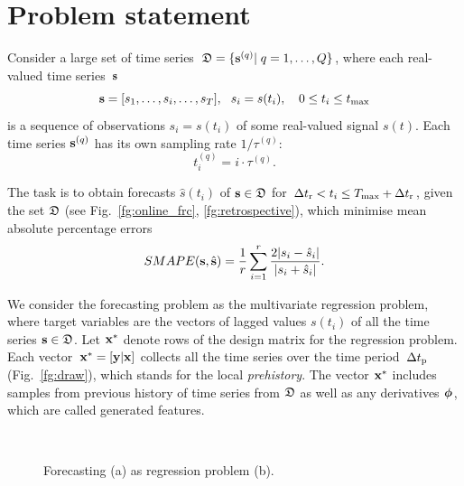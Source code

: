 \documentclass[conference]{IEEEtran}
\begin{document}
\section{Problem statement}
Consider a large set of time series~${\mathfrak{D}}=\{{\mathbf{s}}^{(q)}| \; q = 1,\dots, {Q}\}$, where each real-valued time series~${\mathbf{s}}$
\[ {\mathbf{s}} = [s_1, \dots, s_i, \dots, s_{T}], ~~ s_i = s(t_i),\quad 0 \leq t_i \leq t_{\max}\]
is a sequence of observations $s_i = s(t_i)$ of some real-valued signal $s(t)$.
Each time series ${\mathbf{s}}^{(q)}$ has its own sampling rate $1/\tau^{(q)}$:
\[t_i^{(q)} = {i}\cdot\tau^{(q)}.\]

 The task is to obtain forecasts $\hat{s}(t_i)$ of ${\mathbf{s}} \in {\mathfrak{D}}$ for  $\Delta t_\text{r} <  t_i \leq T_{\max} + \Delta t_\text{r}$, given the set  ${\mathfrak{D}}$ (see Fig.~\ref{fg:online_frc}, \ref{fg:retrospective}), which minimise mean absolute percentage errors
 \begin{equation}\label{eq:MAPE}
 SMAPE(\bs, \hat{\bs}) = \frac{1}{r}\sum_{i = 1}^{r} \frac{2|s_i - \hat{s}_i|}{|s_i + \hat{s}_i|}. \end{equation}


 We consider the forecasting problem as the multivariate regression problem, where target variables are the vectors of lagged values $s(t_i)$ of all the time series ${\mathbf{s}} \in {\mathfrak{D}}$. Let ${\mathbf{x}}^{*}$ denote rows of the design matrix for the regression problem. Each vector~${\mathbf{x}}^{*} = [{\mathbf{y}}| {\mathbf{x}}]$ collects all the time series over the time period~$\Delta t_\text{p}$ (Fig.~\ref{fg:draw}), which stands for the local \emph{prehistory}. The vector ${\mathbf{x}}^{*}$ includes samples from previous history of time series from ${\mathfrak{D}}$ as well as any derivatives ${\boldsymbol{\phi}}$, which are called generated features.



\begin{figure}[!ht]
\centering
{} \\
\centering {}
\caption{Forecasting (a) as regression problem (b).}
\end{figure}
\end{document}

